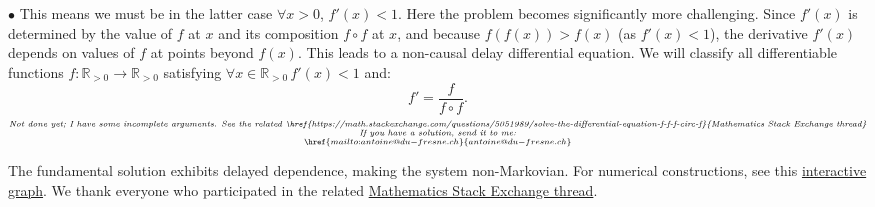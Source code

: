\begin{solution}
    \\\\
    \( \bullet \) This means we must be in the latter case \( \forall x>0 \), \( f'\left(x\right) < 1 \). Here the problem becomes significantly more challenging. Since \( f'\left(x\right) \) is determined by the value of \( f \) at \( x \) and its composition \( f \circ f \) at \( x \), and because \( f\left(f\left(x\right)\right) > f\left(x\right) \) (as \( f'\left(x\right)<1 \)), the derivative \( f'\left(x\right) \) depends on values of \( f \) at points beyond \( f\left(x\right) \). This leads to a non-causal delay differential equation. We will classify all differentiable functions \( f: \mathbb{R}_{>0} \to \mathbb{R}_{>0} \) satisfying \( \forall x \in \mathbb{R}_{>0}\, f'\left(x\right) < 1 \) and:
    \[
        f' = \frac{f}{f\circ f}.
    \]
    \[
        \substack{\textit{Not done yet; I have some incomplete arguments. See the related \href{https://math.stackexchange.com/questions/5051989/solve-the-differential-equation-f-f-f-circ-f}{Mathematics Stack Exchange thread}}\\
            \textit{If you have a solution, send it to me:} \\ \href{mailto:antoine@du-fresne.ch}{antoine@du-fresne.ch}}
    \]
    \begin{remark}
        The fundamental solution exhibits delayed dependence, making the system non-Markovian. For numerical constructions, see this \href{https://www.desmos.com/calculator/hfizeaaf9k}{interactive graph}. We thank everyone who participated in the related \href{https://math.stackexchange.com/questions/5051989/solve-the-differential-equation-f-f-f-circ-f}{Mathematics Stack Exchange thread}.
    \end{remark}
\end{solution}
